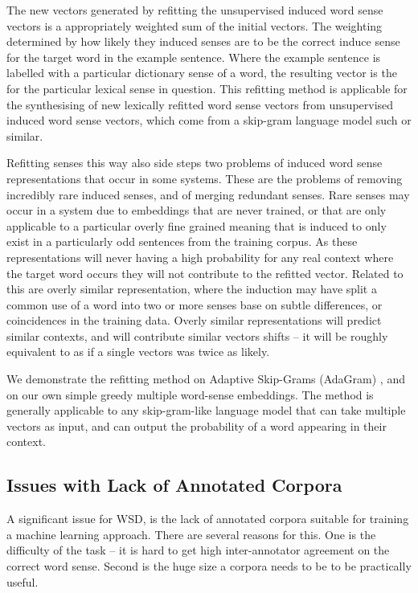 \documentclass{sig-alternate}
\begin{document}
The new vectors generated by refitting the unsupervised induced word sense vectors is a appropriately weighted sum of the initial vectors. The weighting determined by how likely they induced senses are to be the correct induce sense for the target word in the example sentence. Where the example sentence is labelled with a particular dictionary sense of a word, the resulting vector is the for the particular lexical sense in question. This refitting method is applicable for the synthesising of new lexically refitted word sense vectors from unsupervised induced word sense vectors, which come from a skip-gram language model such or similar.


Refitting senses this way also side steps two problems of induced word sense representations that occur in some systems. These are the problems of removing incredibly rare induced senses, and of merging redundant senses.
Rare senses may occur in a system due to embeddings that are never trained, or that are only applicable to a particular overly fine grained meaning that is induced to only exist in a particularly odd sentences from the training corpus. As these representations will never having a high probability for any real context where the target word occurs they will not contribute to the refitted vector. Related to this are overly similar representation, where the induction may have split a common use of a word into two or more senses base on subtle differences, or coincidences in the training data. Overly similar representations will  predict similar contexts, and will contribute similar vectors shifts -- it will be roughly equivalent to as if a single vectors was twice as likely.


We demonstrate the refitting method on Adaptive Skip-Grams (AdaGram) \parencite{AdaGrams}, and on our own simple greedy multiple word-sense embeddings. The method is generally applicable to any skip-gram-like language model that can take multiple vectors as input, and can output the probability of a word appearing in their context.

\subsection{Issues with Lack of Annotated Corpora} \label{corpussize}
A significant issue for WSD, is the lack of annotated corpora suitable for training a machine learning approach.
There are several reasons for this. One is the difficulty of the task -- it is hard to get high inter-annotator agreement on the correct word sense. Second is the huge size a corpora needs to be to be practically useful.
\end{document}
